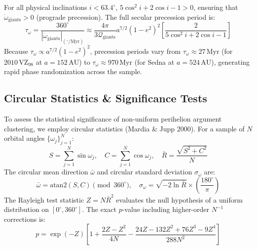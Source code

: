 \documentclass[11pt,a4paper]{article}
\begin{document}
For all physical inclinations $i < 63.4^\circ$, $5\cos^2 i + 2\cos i - 1 > 0$, ensuring that $\dot{\omega}_{\text{giants}} > 0$ (prograde precession). The full secular precession period is:
\begin{equation}
\tau_\omega = \frac{360^\circ}{|\dot{\omega}_{\text{giants}}|_{(^\circ/\text{Myr})}} \approx \frac{4\pi}{3 \mathcal{Q}_{\text{giants}}} a^{7/2} (1 - e^2)^2 \left[\frac{2}{5\cos^2 i + 2\cos i - 1}\right]
\label{eq:tau_omega}
\end{equation}
Because $\tau_\omega \propto a^{7/2} (1 - e^2)^2$, precession periods vary from $\tau_\omega \approx 27\,\text{Myr}$ (for $2010\,\text{VZ}_{98}$ at $a=152\,\text{AU}$) to $\tau_\omega \approx 970\,\text{Myr}$ (for Sedna at $a=524\,\text{AU}$), generating rapid phase randomization across the sample.

\subsection{Circular Statistics \& Significance Tests}
To assess the statistical significance of non-uniform perihelion argument clustering, we employ circular statistics (Mardia \& Jupp 2000). For a sample of $N$ orbital angles $\{\omega_j\}_{j=1}^N$:
\begin{equation}
S = \sum_{j=1}^N \sin\omega_j, \quad C = \sum_{j=1}^N \cos\omega_j, \quad \bar{R} = \frac{\sqrt{S^2 + C^2}}{N}
\label{eq:resultant_length}
\end{equation}
The circular mean direction $\bar{\omega}$ and circular standard deviation $\sigma_\omega$ are:
\begin{equation}
\bar{\omega} = \text{atan2}(S, C) \pmod{360^\circ}, \quad \sigma_\omega = \sqrt{-2\ln\bar{R}} \times \left(\frac{180^\circ}{\pi}\right)
\label{eq:circular_mean}
\end{equation}
The Rayleigh test statistic $Z = N \bar{R}^2$ evaluates the null hypothesis of a uniform distribution on $[0^\circ, 360^\circ]$. The exact $p$-value including higher-order $N^{-1}$ corrections is:
\begin{equation}
p = \exp(-Z) \left[ 1 + \frac{2Z - Z^2}{4N} - \frac{24Z - 132Z^2 + 76Z^3 - 9Z^4}{288N^2} \right]
\label{eq:rayleigh_p}
\end{equation}
\end{document}
